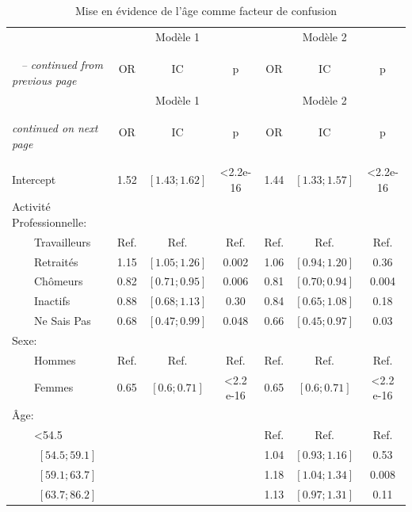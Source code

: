 \documentclass{book}
\begin{document}
\begin{longtable}{lccc|ccc}\caption{Mise en évidence de l'âge comme facteur de confusion}\\
    \hline  
    		 & &    Modèle 1 &   &    &   Modèle 2    &\\
		& \multirow{3}{*}{OR} & \multirow{3}{*}{IC}& \multirow{3}{*}{p} & \multirow{3}{*}{OR} & \multirow{3}{*}{IC}& \multirow{3}{*}{p}\\ 
		 &      &     &    &   	    &  	    &\\
   \hline
    \hline     
    \endfirsthead 
    \multicolumn{4}{l}{\tablename\ \thetable{} \textit{-- continued from previous page}}\\ 
    \hline
	    		 & &    Modèle 1 &   &   &   Modèle 2    &\\
		& \multirow{3}{*}{OR} & \multirow{3}{*}{IC}& \multirow{3}{*}{p} & \multirow{3}{*}{OR} & \multirow{3}{*}{IC}& \multirow{3}{*}{p}\\ 
		 &      &     &    &   	    &  	    &\\
    \hline
    \hline  
    \endhead   
    \hline
    \multicolumn{4}{l}{\textit{continued on next page}} \\ 
    &    				    &    			    &                  \\ 
    \endfoot   
    \multicolumn{4}{l}{}  \\ 
    \endlastfoot 
        
Intercept & 1.52 & $\left[1.43 ; 1.62 \right]$ & <2.2e-16 & 1.44 & $\left[1.33 ; 1.57 \right]$ & <2.2e-16\\
Activité Professionnelle: &              &              &	&&&\\ 
$\qquad$Travailleurs 		&		Ref.		& 	Ref.		&	Ref.&Ref.&Ref.&Ref.\\ 
$\qquad$Retraités&1.15 &$\left[1.05 ; 1.26 \right]$ & 0.002&1.06 &$\left[0.94 ; 1.20 \right]$ & 0.36\\ 
$\qquad$Chômeurs & 0.82& $\left[0.71 ; 0.95\right]$& 0.006 & 0.81& $\left[0.70 ; 0.94\right]$& 0.004\\ 
$\qquad$Inactifs  & 0.88& $\left[0.68 ; 1.13\right]$& 0.30 & 0.84& $\left[0.65 ; 1.08\right]$& 0.18\\  
$\qquad$Ne Sais Pas & 0.68& $\left[0.47 ; 0.99\right]$ & 0.048& 0.66& $\left[0.45 ; 0.97\right]$ & 0.03 \\
Sexe: &              &              &                        &&&  \\ 
$\qquad$Hommes &Ref. & Ref.& Ref.&Ref.&Ref.&Ref.\\ 
$\qquad$Femmes & 0.65& $\left[0.6 ; 0.71 \right]$ & <2.2 e-16& 0.65& $\left[0.6 ; 0.71 \right]$ & <2.2 e-16\\
Âge: &&&&&&\\
$\qquad$<54.5 &&&&Ref.&Ref.&Ref.\\
$\qquad$ $\left[54.5 ; 59.1 \right]$&&& &1.04& $\left[0.93 ; 1.16 \right]$& 0.53\\
$\qquad$ $\left[59.1 ; 63.7\right]$&&& &1.18&$\left[1.04 ; 1.34 \right]$& 0.008\\
$\qquad$ $\left[63.7 ; 86.2 \right]$&&&&1.13&$\left[0.97 ; 1.31 \right]$&0.11\\  
 

\end{longtable}
\end{document}
